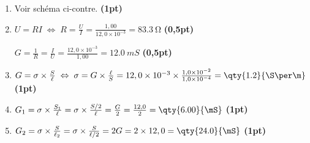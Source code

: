 \begin{minipage}{0.75\linewidth}
    \begin{enumerate}
        \item Voir schéma ci-contre. \hfill\textbf{(1pt)}
        \item $U=RI \;\Leftrightarrow\;
              R=\frac{U}{I}=\frac{1,00}{12,0\times 10^{-3}}=\qty{83,3}{\ohm}$
              \hfill\textbf{(0,5pt)}

              $G=\frac{1}{R}=\frac{I}{U}=
              \frac{12,0\times 10^{-3}}{1,00}=
              \qty{12,0}{mS}$
              \hfill\textbf{(0,5pt)}

        \item $G=\sigma\times\frac{S}{\ell} \;\Leftrightarrow\;
              \sigma=G\times\frac{\ell}{S}=
              12,0\times 10^{-3} \times
              \frac{1,0\times 10^{-2}}{1,0\times 10^{-4}}=
              \qty{1.2}{\S\per\m}$
              \hfill\textbf{(1pt)}
        \item $G_{1}=\sigma\times\frac{S_{1}}{\ell}=
              \sigma\times\frac{S/2}{\ell}=\frac{G}{2}=
              \frac{12,0}{2}=\qty{6.00}{\mS}$
              \hfill\textbf{(1pt)}
        \item $G_{2}=\sigma\times\frac{S}{\ell_{2}}=
              \sigma\times\frac{S}{\ell/2}=2G=
              2\times 12,0=\qty{24.0}{\mS}$
              \hfill\textbf{(1pt)}
    \end{enumerate}
\end{minipage}
\hfill
